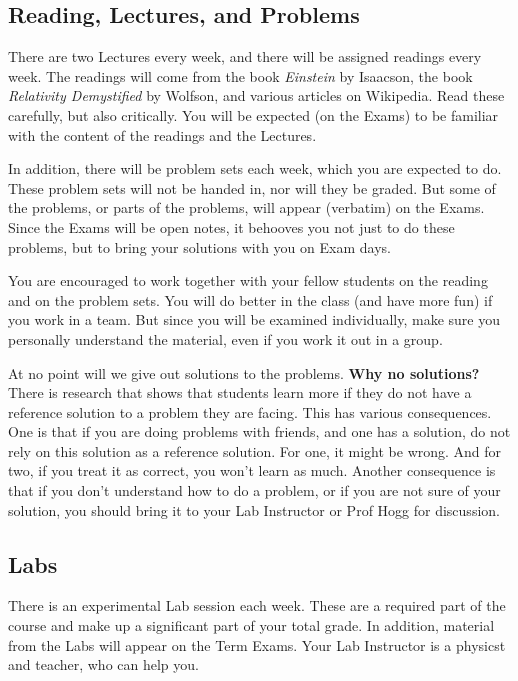 \documentclass[12pt]{article}
\begin{document}
\subsection*{Reading, Lectures, and Problems}

There are two Lectures every week, and there
will be assigned readings every week.
The readings will come from the book \textit{Einstein} by Isaacson,
the book \textit{Relativity Demystified} by Wolfson,
and various articles on Wikipedia.
Read these carefully, but also critically.
You will be expected (on the Exams) to be familiar with the content of
the readings and the Lectures.

In addition, there will be problem sets each week, which you are
expected to do.
These problem sets will not be handed in, nor will they be graded.
But some of the problems, or parts of the problems, will appear
(verbatim) on the Exams.
Since the Exams will be open notes, it behooves you not just to do
these problems, but to bring your solutions with you on Exam days.

You are encouraged to work together with your fellow students on the
reading and on the problem sets.
You will do better in the class (and have more fun) if you work in a
team.
But since you will be examined individually, make sure you personally
understand the material, even if you work it out in a group.

At no point will we give out solutions to the problems. \textbf{Why no
  solutions?} There is research that shows that students learn more if
they do not have a reference solution to a problem they are
facing. This has various consequences. One is that if you are doing
problems with friends, and one has a solution, do not rely on this
solution as a reference solution. For one, it might be wrong. And for
two, if you treat it as correct, you won't learn as much. Another
consequence is that if you don't understand how to do a problem, or if
you are not sure of your solution, you should bring it to your Lab
Instructor or Prof Hogg for discussion.

\subsection*{Labs}

There is an experimental Lab session each week. These are a required
part of the course and make up a significant part of your total grade.
In addition, material from the Labs will appear on the Term Exams.
Your Lab Instructor is a physicst and teacher, who can help you.
\end{document}
